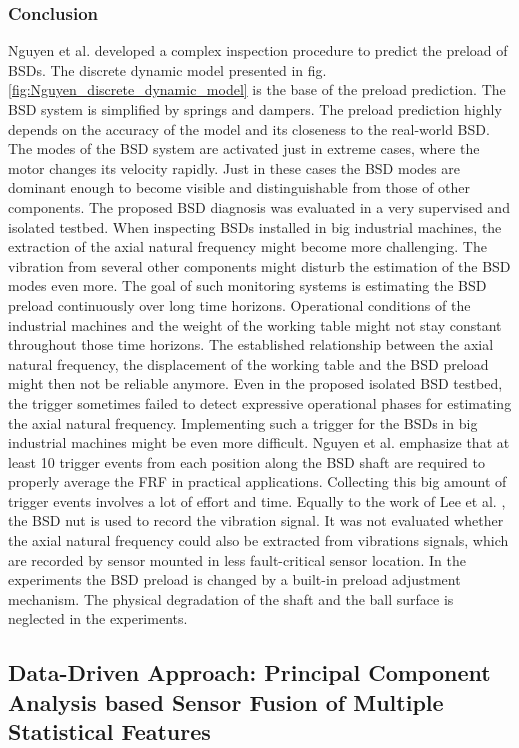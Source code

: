 \subsubsection{Conclusion}
Nguyen et al. \cite{NGUYEN2019} developed a complex inspection procedure to predict the preload of BSDs. The discrete dynamic model presented in fig. \ref{fig:Nguyen_discrete_dynamic_model} is the base of the preload prediction. The BSD system is simplified by springs and dampers. The preload prediction highly depends on the accuracy of the model and its closeness to the real-world BSD. The modes of the BSD system are activated just in extreme cases, where the motor changes its velocity rapidly. Just in these cases the BSD modes are dominant enough to become visible and distinguishable from those of other components. The proposed BSD diagnosis was evaluated in a very supervised and isolated testbed. When inspecting BSDs installed in big industrial machines, the extraction of the axial natural frequency might become more challenging. The vibration from several other components might disturb the estimation of the BSD modes even more. The goal of such monitoring systems is estimating the BSD preload continuously over long time horizons. Operational conditions of the industrial machines and the weight of the working table might not stay constant throughout those time horizons. The established relationship between the axial natural frequency, the displacement of the working table and the BSD preload might then not be reliable anymore. Even in the proposed isolated BSD testbed, the trigger sometimes failed to detect expressive operational phases for estimating the axial natural frequency. Implementing such a trigger for the BSDs in big industrial machines might be even more difficult. Nguyen et al. \cite{NGUYEN2019} emphasize that at least 10 trigger events from each position along the BSD shaft are required to properly average the FRF in practical applications. Collecting this big amount of trigger events involves a lot of effort and time. Equally to the work of Lee et al. \cite{Lee2015}, the BSD nut is used to record the vibration signal. It was not evaluated whether the axial natural frequency could also be extracted from vibrations signals, which are recorded by sensor mounted in less fault-critical sensor location. In the experiments the BSD preload is changed by a built-in preload adjustment mechanism. The physical degradation of the shaft and the ball surface is neglected in the experiments.

\subsection{Data-Driven Approach: Principal Component Analysis based Sensor Fusion of Multiple Statistical Features}

